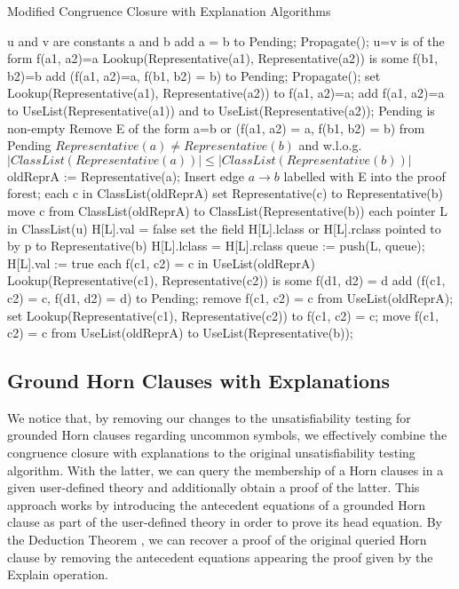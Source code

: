 \documentclass[sigconf,authordraft]{acmart}
\begin{document}
\begin{algorithm}
  \caption{Modified Congruence Closure with Explanation Algorithms}
  \begin{algorithmic}[2]
    \If u and v are constants a and b
    \State add a = b to Pending; Propagate();
    \Else \Comment u=v is of the form f(a1, a2)=a
    \If Lookup(Representative(a1), Representative(a2)) is some f(b1, b2)=b
    \State add (f(a1, a2)=a, f(b1, b2) = b) to Pending; Propagate();
    \Else
    \State set Lookup(Representative(a1), Representative(a2)) to f(a1, a2)=a;
    \State add f(a1, a2)=a to UseList(Representative(a1)) and to UseList(Representative(a2));
    \EndIf
    \EndIf
    \EndProcedure
    \Statex
     {\text{ }}
    \While Pending is non-empty
    \State Remove E of the form a=b or (f(a1, a2) = a, f(b1, b2) = b) from Pending
    \If $Representative(a) \neq Representative(b)$ and w.l.o.g. $|ClassList(Representative(a))| \leq |ClassList(Representative(b))|$
    \State oldReprA := Representative(a);
    \State Insert edge $a \rightarrow b$ labelled with E into the proof forest;
    \For each c in ClassList(oldReprA)
    \State set Representative(c) to Representative(b)
    \State move c from ClassList(oldReprA) to ClassList(Representative(b))
    \For each pointer L in ClassList(u)
    \If H[L].val = false
    \State set the field H[L].lclass or H[L].rclass pointed to by p to Representative(b)
    \If H[L].lclass = H[L].rclass
    \State queue := push(L, queue);
    \State H[L].val := true
    \EndIf
    \EndIf
    \EndFor
    \EndFor
    \For each f(c1, c2) = c in UseList(oldReprA)
    \If Lookup(Representative(c1), Representative(c2)) is some f(d1, d2) = d
    \State add (f(c1, c2) = c, f(d1, d2) = d) to Pending;
    \State remove f(c1, c2) = c from UseList(oldReprA);
    \Else
    \State set Lookup(Representative(c1), Representative(c2)) to f(c1, c2) = c;
    \State move f(c1, c2) = c from UseList(oldReprA) to UseList(Representative(b));
    \EndIf
    \EndFor 
    \EndIf
    \EndWhile
    \EndProcedure
  \end{algorithmic}
\end{algorithm}

\subsection{Ground Horn Clauses with Explanations}

We notice that, by removing our changes to the unsatisfiability testing
for grounded Horn clauses regarding uncommon symbols, we effectively combine
the congruence closure with explanations to the original unsatisfiability
testing algorithm. With the latter, we can query the membership of a Horn
clauses in a given user-defined theory and additionally obtain a proof of
the latter. This approach works by introducing the antecedent equations of
a grounded Horn clause as part of the user-defined theory in order to prove
its head equation. By the Deduction Theorem \cite{10.5555/1642730}, we can
recover a proof of the original queried Horn clause by removing the antecedent
equations appearing the proof given by the Explain operation.
\end{document}
